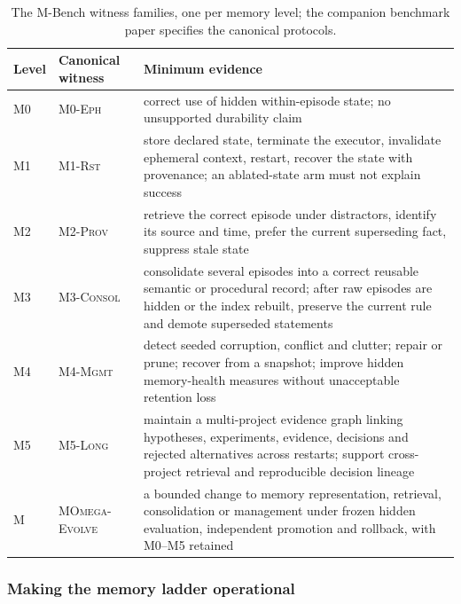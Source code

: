 \begin{table}[!htbp]
\centering\small
\begin{tabularx}{\textwidth}{@{}llY@{}}
\toprule
Level & Canonical witness & Minimum evidence \\
\midrule
M0 & \textsc{M0-Eph} & correct use of hidden within-episode state; no unsupported durability claim \\
M1 & \textsc{M1-Rst} & store declared state, terminate the executor, invalidate ephemeral context, restart, recover the state with provenance; an ablated-state arm must not explain success \\
M2 & \textsc{M2-Prov} & retrieve the correct episode under distractors, identify its source and time, prefer the current superseding fact, suppress stale state \\
M3 & \textsc{M3-Consol} & consolidate several episodes into a correct reusable semantic or procedural record; after raw episodes are hidden or the index rebuilt, preserve the current rule and demote superseded statements \\
M4 & \textsc{M4-Mgmt} & detect seeded corruption, conflict and clutter; repair or prune; recover from a snapshot; improve hidden memory-health measures without unacceptable retention loss \\
M5 & \textsc{M5-Long} & maintain a multi-project evidence graph linking hypotheses, experiments, evidence, decisions and rejected alternatives across restarts; support cross-project retrieval and reproducible decision lineage \\
M\Om{} & \textsc{MOmega-Evolve} & a bounded change to memory representation, retrieval, consolidation or management under frozen hidden evaluation, independent promotion and rollback, with M0--M5 retained \\
\bottomrule
\end{tabularx}
\caption{The M-Bench witness families, one per memory level; the companion benchmark paper specifies the canonical protocols.}
\label{tab:mbench}
\end{table}

\subsubsection{Making the memory ladder operational}\label{sec:mops}

